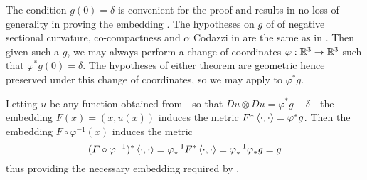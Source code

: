 \documentclass[a4paper, 12pt]{amsart}
\begin{document}
\begin{rem}
The condition \(g(0) = \delta\) is convenient for the proof and results in no loss of generality in proving the embedding . The hypotheses on \(g\) of of negative sectional curvature, co-compactness and \(\alpha\) Codazzi in  are the same as in . Then given such a \(g\), we may always perform a change of coordinates \(\varphi : \mathbb{R}^3 \to \mathbb{R}^3\) such that \(\varphi^{\ast} g (0) = \delta\). The hypotheses of either theorem are geometric hence preserved under this change of coordinates, so we may apply  to \(\varphi^{\ast} g\).

Letting \(u\) be any function obtained from  - so that \(Du \otimes Du = \varphi^{\ast} g - \delta\) - the embedding \(F(x) = (x, u(x))\) induces the metric \(F^{\ast} \left\langle \cdot,\cdot \right\rangle = \varphi^{\ast} g\). Then the embedding \(F \circ \varphi^{-1} (x)\) induces the metric
\[
(F \circ \varphi^{-1})^{\ast} \left\langle \cdot,\cdot \right\rangle = \varphi^{-1}_{\ast} F^{\ast} \left\langle \cdot,\cdot \right\rangle = \varphi^{-1}_{\ast} \varphi_{\ast} g = g
\]
thus providing the necessary embedding required by .
\end{rem}
\end{document}
